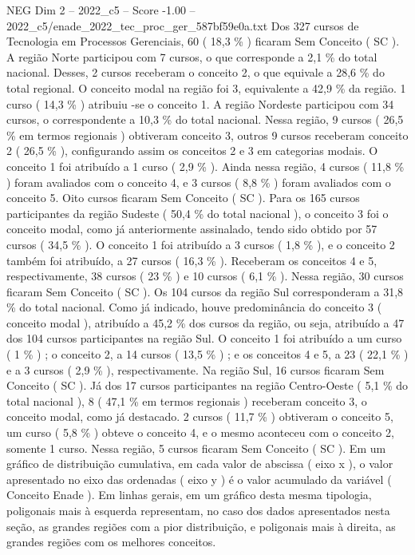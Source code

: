\begin{textsample}{NEG Dim 2 – 2022\_c5 – Score -1.00 – 2022\_c5/enade\_2022\_tec\_proc\_ger\_587bf59e0a.txt}
Dos 327 cursos de Tecnologia em Processos Gerenciais, 60 ( 18,3 \% ) ficaram Sem Conceito ( SC ).
A região Norte participou com 7 cursos, o que corresponde a 2,1 \% do total nacional.
Desses, 2 cursos receberam o conceito 2, o que equivale a 28,6 \% do total regional.
O conceito modal na região foi 3, equivalente a 42,9 \% da região. 1 curso ( 14,3 \% ) atribuiu -se o conceito 1.
A região Nordeste participou com 34 cursos, o correspondente a 10,3 \% do total nacional.
Nessa região, 9 cursos ( 26,5 \% em termos regionais ) obtiveram conceito 3, outros 9 cursos receberam conceito 2 ( 26,5 \% ), configurando assim os conceitos 2 e 3 em categorias modais.
O conceito 1 foi atribuído a 1 curso ( 2,9 \% ).
Ainda nessa região, 4 cursos ( 11,8 \% ) foram avaliados com o conceito 4, e 3 cursos ( 8,8 \% ) foram avaliados com o conceito 5.
Oito cursos ficaram Sem Conceito ( SC ).
Para os 165 cursos participantes da região Sudeste ( 50,4 \% do total nacional ), o conceito 3 foi o conceito modal, como já anteriormente assinalado, tendo sido obtido por 57 cursos ( 34,5 \% ).
O conceito 1 foi atribuído a 3 cursos ( 1,8 \% ), e o conceito 2 também foi atribuído, a 27 cursos ( 16,3 \% ).
Receberam os conceitos 4 e 5, respectivamente, 38 cursos ( 23 \% ) e 10 cursos ( 6,1 \% ).
Nessa região, 30 cursos ficaram Sem Conceito ( SC ).
Os 104 cursos da região Sul corresponderam a 31,8 \% do total nacional.
Como já indicado, houve predominância do conceito 3 ( conceito modal ), atribuído a 45,2 \% dos cursos da região, ou seja, atribuído a 47 dos 104 cursos participantes na região Sul.
O conceito 1 foi atribuído a um curso ( 1 \% ) ; o conceito 2, a 14 cursos ( 13,5 \% ) ; e os conceitos 4 e 5, a 23 ( 22,1 \% ) e a 3 cursos ( 2,9 \% ), respectivamente.
Na região Sul, 16 cursos ficaram Sem Conceito ( SC ).
Já dos 17 cursos participantes na região Centro-Oeste ( 5,1 \% do total nacional ), 8 ( 47,1 \% em termos regionais ) receberam conceito 3, o conceito modal, como já destacado. 2 cursos ( 11,7 \% ) obtiveram o conceito 5, um curso ( 5,8 \% ) obteve o conceito 4, e o mesmo aconteceu com o conceito 2, somente 1 curso.
Nessa região, 5 cursos ficaram Sem Conceito ( SC ).
Em um gráfico de distribuição cumulativa, em cada valor de abscissa ( eixo x ), o valor apresentado no eixo das ordenadas ( eixo y ) é o valor acumulado da variável ( Conceito Enade ).
Em linhas gerais, em um gráfico desta mesma tipologia, poligonais mais à esquerda representam, no caso dos dados apresentados nesta seção, as grandes regiões com a pior distribuição, e poligonais mais à direita, as grandes regiões com os melhores conceitos.

\end{textsample}
